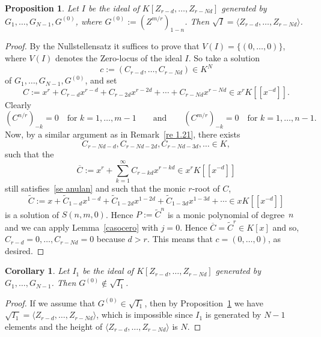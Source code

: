 \documentclass[reqno,a4paper]{amsart}
\newtheorem{proposition}[theorem]{Proposition}
\newtheorem{corollary}[theorem]{Corollary}
\theoremstyle{definition}
\theoremstyle{remark}
\newcommand{\ov}{\overline}
\begin{document}
\begin{proposition}\label{le radical} Let $I$ be the ideal of $K[Z_{r-d},\dots, Z_{r-Nd}]$ generated by
$G_1,\dots,G_{N-1},G^{(0)}$, where $G^{(0)}:=(Z^{m/r})_{1-n}$. Then $\sqrt{I}=
\langle Z_{r-d},\dots, Z_{r-Nd} \rangle$.
\end{proposition}

\begin{proof} By the Nullstellensatz it suffices to prove that $V(I) = \{(0,\dots,0)\}$, where $V(I)$ denotes the
Zero-locus of the ideal $I$. So take a solution
$$
c:=(C_{r-d},\dots,C_{r-Nd})\in  K^{N}
$$
of $G_1,\dots,G_{N-1},G^{(0)}$, and set
$$
C := x^r+C_{r-d}x^{r-d}+C_{r-2d}x^{r-2d}+\cdots+C_{r-Nd}x^{r-Nd}\in x^rK[[x^{-d}]].
$$
Clearly
\begin{equation}\label{se anulan}
(C^{n/r})_{-k}=0\quad\text{for $k=1,\dots,m-1$}\qquad\text{and}\qquad
(C^{m/r})_{-k}=0\quad\text{for $k=1,\dots,n-1$.}
\end{equation}
Now, by a similar argument as in Remark~\ref{re 1.21}, there exists
$$
C_{r-Nd-d},C_{r-Nd-2d},C_{r-Nd-3d},\dots\in K,
$$
such that the
$$
\ov{C}:= x^r+ \sum_{k=1}^{\infty}  C_{r-kd}x^{r-kd}\in x^rK[[x^{-d}]]
$$
still satisfies~\eqref{se anulan} and such that the monic $r$-root of $C$,
$$
\tilde C:= x + \tilde C_{1-d}x^{1-d}+ \tilde C_{1-2d}x^{1-2d}+ \tilde C_{1-3d}x^{1-3d}+\cdots \in x K[[x^{-d}]]
$$
is a solution of $S(n,m,0)$. Hence $P:=\tilde C^n$ is a monic polynomial of degree~$n$ and we can apply
Lemma~\ref{casocero} with $j=0$. Hence $\ov{C} = \tilde C^r \in K[x]$ and so, $C_{r-d}=0,\dots,C_{r-Nd}=0$ because $d>r$.
This means that $c = (0,\dots,0)$, as desired.
\end{proof}

\begin{corollary}\label{no pertenece ralo} Let $I_1$ be the ideal of $K[Z_{r-d},\dots, Z_{r-Nd}]$ generated
by $G_1,\dots,G_{N-1}$. Then $G^{(0)}\notin \sqrt{I_1}$.
\end{corollary}

\begin{proof} If we assume that $G^{(0)}\in \sqrt{I_1}$, then by Proposition~\ref{le radical} we have $\sqrt{I_1} =
\langle Z_{r-d},\dots, Z_{r-Nd}\rangle$, which is impossible since $I_1$ is generated by $N-1$ elements and
the height of $\langle Z_{r-d},\dots, Z_{r-Nd}\rangle$ is $N$.
\end{proof}
\end{document}
